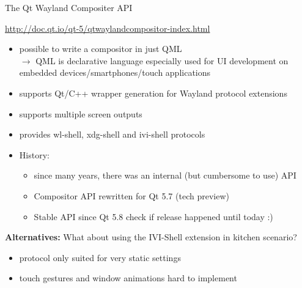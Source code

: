 \documentclass[ucs,9pt]{beamer}
\begin{document}
\begin{frame}
    {The Qt Wayland Compositer API}

    \url{http://doc.qt.io/qt-5/qtwaylandcompositor-index.html}

    \begin{itemize}
        \item possible to write a compositor in just QML\\
            $\rightarrow$ QML is declarative language especially used for UI development on embedded devices/smartphones/touch applications
        \item supports Qt/C++ wrapper generation for Wayland protocol extensions
        \item supports multiple screen outputs
        \item provides wl-shell, xdg-shell and ivi-shell protocols
        \item History:
            \begin{itemize}
                \item since many years, there was an internal (but cumbersome to use) API
                \item Compositor API rewritten for Qt 5.7 (tech preview)
                \item Stable API since Qt 5.8 \alert{check if release happened until today :)}
            \end{itemize}
    \end{itemize}
    \medskip

    \textbf{Alternatives:} What about using the IVI-Shell extension in kitchen scenario?
    \begin{itemize}
        \item protocol only suited for very static settings
        \item touch gestures and window animations hard to implement
    \end{itemize}
\end{frame}
\end{document}
